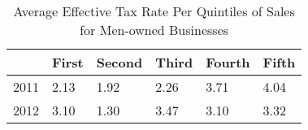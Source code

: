 \begin{table}[htbp]
\caption{\label{tab:tableA2} Average Effective Tax Rate Per Quintiles of Sales for Men-owned Businesses}\centering\medskip
\begin{tabular}{llllll} \hline \hline
 & First  & Second  & Third  & Fourth  & Fifth  \\  \hline 
2011 &      2.13 &      1.92 &      2.26 &      3.71 &      4.04 \\  
2012 &      3.10 &      1.30 &      3.47 &      3.10 &      3.32 \\  
\hline \hline \end{tabular}
\end{table}
